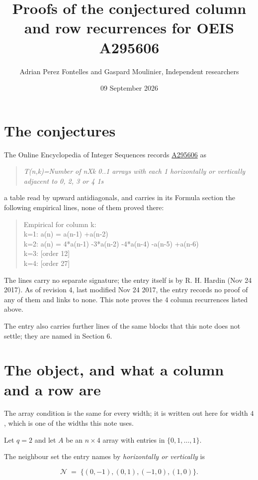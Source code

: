 \documentclass[11pt]{article}
\title{Proofs of the conjectured column and row recurrences for OEIS A295606}
\author{Adrian Perez Fontelles and Gaspard Moulinier, Independent researchers}
\date{09 September 2026}
\theoremstyle{definition}
\begin{document}
\maketitle
\section{The conjectures}

The Online Encyclopedia of Integer Sequences records \href{https://oeis.org/A295606}{A295606} as

\begin{quote}\itshape T(n,k)=Number of nXk 0..1 arrays with each 1 horizontally or vertically adjacent to 0, 2, 3 or 4 1s\end{quote}

a table read by upward antidiagonals, and carries in its Formula section the following empirical lines, none of them proved there:

\begin{quote}\ttfamily Empirical for column k:\\
k=1: a(n) = a(n-1) +a(n-2)\\k=2: a(n) = 4*a(n-1) -3*a(n-2) -4*a(n-4) -a(n-5) +a(n-6)\\k=3: [order 12]\\k=4: [order 27]\end{quote}

The lines carry no separate signature; the entry itself is by R. H. Hardin (Nov 24 2017). As of revision 4, last modified Nov 24 2017, the entry records no proof of any of them and links to none. This note proves the 4 column recurrences listed above.

The entry also carries further lines of the same blocks that this note does not settle; they are named in Section 6.

\section{The object, and what a column and a row are}

The array condition is the same for every width; it is written out here for width $4$, which is one of the widths this note uses.

Let $q = 2$ and let $A$ be an $n \times 4$ array with entries in $\{0,1,\dots,1\}$.

The neighbour set the entry names by {\itshape horizontally or vertically} is

\[\mathcal{N} \;=\; \{(0,-1), (0,1), (-1,0), (1,0)\}.\]
\end{document}
